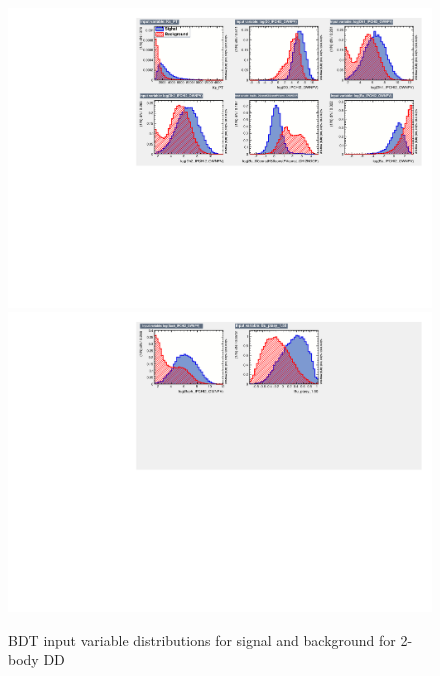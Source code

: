 \begin{figure}[tb]
\includegraphics[width=\linewidth]{figures/selection/inputvariables_KPi_DD_run1_1.pdf}
\includegraphics[width=\linewidth]{figures/selection/inputvariables_KPi_DD_run1_2.pdf}
\caption{BDT input variable distributions for signal and background for 2-body DD}
\label{BDTinputdist2bodyDD}
\end{figure}

